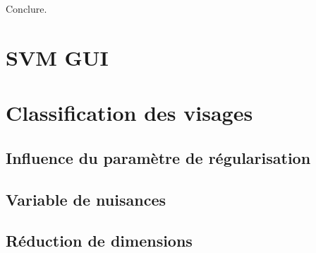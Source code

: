 \documentclass[a4paper,12pt]{article}
\begin{document}
Conclure.

\section{SVM GUI}

\section{Classification des visages}

\subsection{Influence du paramètre de régularisation}

\subsection{Variable de nuisances}

\subsection{Réduction de dimensions}
\end{document}
